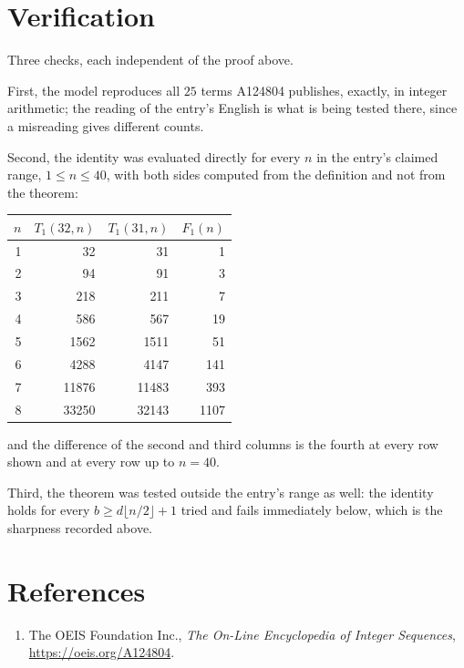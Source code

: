 \documentclass[11pt,a4paper]{article}
\theoremstyle{plain}
\theoremstyle{definition}
\begin{document}
\section{Verification}

Three checks, each independent of the proof above.

First, the model reproduces all $25$ terms A124804 publishes, exactly, in integer
arithmetic; the reading of the entry's English is what is being tested there, since a
misreading gives different counts.

Second, the identity was evaluated directly for every $n$ in the entry's claimed range,
$1\le n\le40$, with both sides computed from the definition and not from the theorem:

\begin{center}
\begin{tabular}{rrrr}
$n$ & $T_{1}(32,n)$ & $T_{1}(31,n)$ & $F_{1}(n)$ \\ \hline
1 & 32 & 31 & 1 \\
2 & 94 & 91 & 3 \\
3 & 218 & 211 & 7 \\
4 & 586 & 567 & 19 \\
5 & 1562 & 1511 & 51 \\
6 & 4288 & 4147 & 141 \\
7 & 11876 & 11483 & 393 \\
8 & 33250 & 32143 & 1107 \\
\end{tabular}
\end{center}

\noindent and the difference of the second and third columns is the fourth at every row shown
and at every row up to $n=40$.

Third, the theorem was tested outside the entry's range as well: the identity holds for every
$b\ge d\lfloor n/2\rfloor+1$ tried and fails immediately below, which is the sharpness recorded
above.

\section*{References}
\begin{enumerate}
\item The OEIS Foundation Inc., \emph{The On-Line Encyclopedia of Integer Sequences},
\url{https://oeis.org/A124804}.
\end{enumerate}
\end{document}
